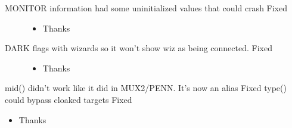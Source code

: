 \documentclass[letterpaper,10pt,english]{sphinxmanual}
\begin{document}
\begin{description}
\begin{itemize}
\end{itemize}

\item[{MONITOR information had some uninitialized values that could crash \sphinxhyphen{} Fixed}] \leavevmode\begin{itemize}
\item {} 
\sphinxAtStartPar
Thanks 

\end{itemize}

\item[{DARK flags with wizards so it won’t show wiz as being connected. \sphinxhyphen{} Fixed}] \leavevmode\begin{itemize}
\item {} 
\sphinxAtStartPar
Thanks 

\end{itemize}

\end{description}

\sphinxAtStartPar
mid() didn’t work like it did in MUX2/PENN.  It’s now an alias \sphinxhyphen{} Fixed
type() could bypass cloaked targets \sphinxhyphen{} Fixed
\begin{itemize}
\item {} 
\sphinxAtStartPar
Thanks 

\end{itemize}
\end{document}
